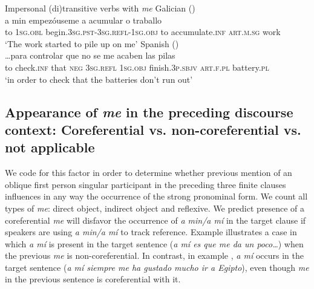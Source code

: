 \documentclass[output=paper]{langscibook}
\begin{document}
\ea%
    Impersonal (di)transitive verbs with \textit{me}\label{ex:brown:5}
    \ea  Galician ()\\
    \gll a min empezóuseme a acumular o traballo\\
         to \textsc{1sg.obl} begin.\textsc{3sg.pst-3sg.refl-1sg.obj} to accumulate.\textsc{inf} \textsc{art.m.sg} work\\
    \glt ‘The work started to pile up on me’
    \ex  Spanish ()\\
    \gll …para controlar que no se me acaben las pilas\\
         to check\textsc{.inf} that \textsc{neg} \textsc{3sg.refl} \textsc{1sg.obj} finish.\textsc{3p.sbjv} \textsc{art.f.pl} battery.\textsc{pl} \\
    \glt ‘in order to check that the batteries don’t run out’
    \z
\z


\subsection{Appearance of \textit{me} in the preceding discourse context: Coreferential vs. non-coreferential vs. not applicable}\largerpage[-2]
We code for this factor in order to determine whether previous mention of an oblique first person singular participant in the preceding three finite clauses influences in any way the occurrence of the strong pronominal form. We count all types of \textit{me}: direct object, indirect object and reflexive. We predict presence of a coreferential \textit{me} will disfavor the occurrence of \textit{a min\slash a mí} in the target clause if speakers are using \textit{a min\slash a mí} to track reference. Example  illustrates a case in which \textit{a mí} is present in the target sentence (\textit{a mí es que me da un poco…}) when the previous \textit{me} is non-coreferential. In contrast, in example , \textit{a mí} occurs in the target sentence (\textit{a mí siempre me ha gustado mucho ir a Egipto}), even though \textit{me} in the previous sentence is coreferential with it.\pagebreak
\end{document}
